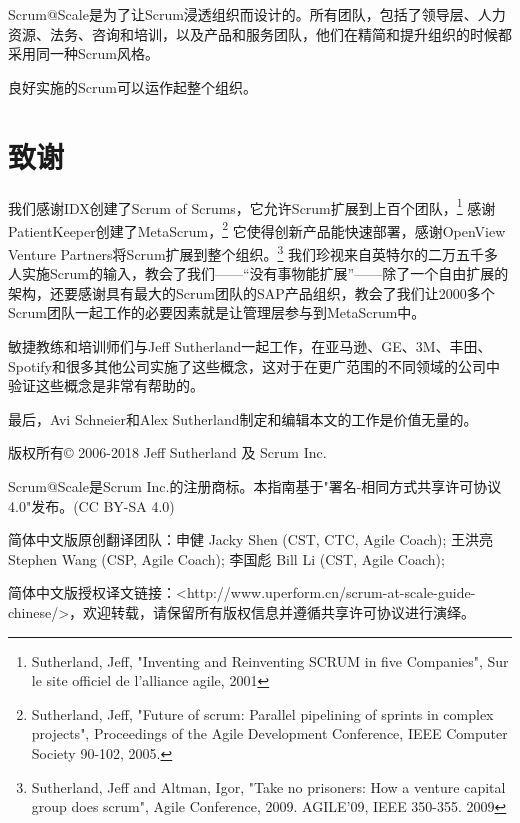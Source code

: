 \documentclass[12pt,a4paper,parskip=full]{scrartcl}
\begin{document}
\begin{CJK*}{UTF8}{gbsn}
Scrum@Scale是为了让Scrum浸透组织而设计的。所有团队，包括了领导层、人力资源、法务、咨询和培训，以及产品和服务团队，他们在精简和提升组织的时候都采用同一种Scrum风格。

良好实施的Scrum可以运作起整个组织。

\section{致谢}
我们感谢IDX创建了Scrum of Scrums，它允许Scrum扩展到上百个团队，\footnote{Sutherland, Jeff,
"Inventing and Reinventing SCRUM in five Companies", Sur le site officiel
de l'alliance agile, 2001} 感谢PatientKeeper创建了MetaScrum，\footnote{Sutherland, Jeff, "Future of scrum: Parallel pipelining
of sprints in complex projects", Proceedings of the Agile Development
Conference,  IEEE Computer Society 90-102,  2005.} 它使得创新产品能快速部署，感谢OpenView Venture Partners将Scrum扩展到整个组织。\footnote{Sutherland, Jeff and Altman,
Igor, "Take no prisoners: How a venture capital group does scrum", Agile
Conference, 2009. AGILE'09, IEEE 350-355.  2009} 我们珍视来自英特尔的二万五千多人实施Scrum的输入，教会了我们——“没有事物能扩展”——除了一个自由扩展的架构，还要感谢具有最大的Scrum团队的SAP产品组织，教会了我们让2000多个Scrum团队一起工作的必要因素就是让管理层参与到MetaScrum中。

敏捷教练和培训师们与Jeff Sutherland一起工作，在亚马逊、GE、3M、丰田、Spotify和很多其他公司实施了这些概念，这对于在更广范围的不同领域的公司中验证这些概念是非常有帮助的。

最后，Avi Schneier和Alex Sutherland制定和编辑本文的工作是价值无量的。



版权所有© 2006-2018 Jeff Sutherland 及 Scrum Inc. 

Scrum@Scale是Scrum Inc.的注册商标。本指南基于"署名-相同方式共享许可协议4.0"发布。(CC BY-SA 4.0)

简体中文版原创翻译团队：申健 Jacky Shen (CST, CTC, Agile Coach); 
王洪亮 Stephen Wang (CSP, Agile Coach); 李国彪 Bill Li (CST, Agile Coach);

简体中文版授权译文链接：<http://www.uperform.cn/scrum-at-scale-guide-chinese/>，欢迎转载，请保留所有版权信息并遵循共享许可协议进行演绎。

\pagebreak

\printbibliography

\clearpage\end{CJK*}
\end{document}
